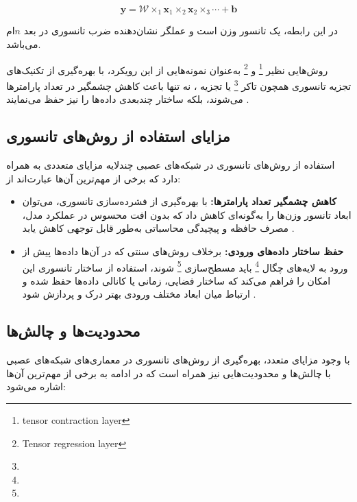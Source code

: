 \begin{equation}
	\mathbf{y} = \mathcal{W} \times_1 \mathbf{x}_1 \times_2 \mathbf{x}_2 \times_3 \cdots + \mathbf{b}
\end{equation}


در این رابطه،  یک تانسور وزن است و عملگر  نشان‌دهنده ضرب تانسوری در بعد $n$‌ام می‌باشد.

روش‌هایی نظیر  \footnote{tensor contraction layer} و  \footnote{Tensor regression layer} به‌عنوان نمونه‌هایی از این رویکرد، با بهره‌گیری از تکنیک‌های تجزیه تانسوری همچون تاکر \footnote{} یا تجزیه ، نه تنها باعث کاهش چشمگیر در تعداد پارامترها می‌شوند، بلکه ساختار چندبعدی داده‌ها را نیز حفظ می‌نمایند \cite{kossaifi2017tensorcontraction, kossaifi2020tensorregression}.

\subsection*{مزایای استفاده از روش‌های تانسوری}

استفاده از روش‌های تانسوری در شبکه‌های عصبی چندلایه مزایای متعددی به همراه دارد که برخی از مهم‌ترین آن‌ها عبارت‌اند از:

\begin{itemize}
	\item \textbf{کاهش چشمگیر تعداد پارامترها:} با بهره‌گیری از فشرده‌سازی تانسوری، می‌توان ابعاد تانسور وزن‌ها را به‌گونه‌ای کاهش داد که بدون افت محسوس در عملکرد مدل، مصرف حافظه و پیچیدگی محاسباتی به‌طور قابل توجهی کاهش یابد \cite{lebedev2015cp, kossaifi2020tensorregression}.
	
	\item \textbf{حفظ ساختار داده‌های ورودی:} برخلاف روش‌های سنتی که در آن‌ها داده‌ها پیش از ورود به لایه‌های چگال \footnote{} باید مسطح‌سازی \footnote{} شوند، استفاده از ساختار تانسوری این امکان را فراهم می‌کند که ساختار فضایی، زمانی یا کانالی داده‌ها حفظ شده و ارتباط میان ابعاد مختلف ورودی بهتر درک و پردازش شود \cite{kossaifi2020tensorregression}.
\end{itemize}

\subsection*{محدودیت‌ها و چالش‌ها}

با وجود مزایای متعدد، بهره‌گیری از روش‌های تانسوری در معماری‌های شبکه‌های عصبی با چالش‌ها و محدودیت‌هایی نیز همراه است که در ادامه به برخی از مهم‌ترین آن‌ها اشاره می‌شود:

